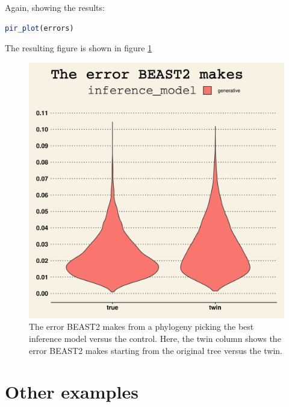 \documentclass{article}
\begin{document}
Again, showing the results:

\begin{lstlisting}[language=R, floatplacement=H, frame=single]
pir_plot(errors)
\end{lstlisting}

The resulting figure is shown in figure \ref{fig:example_3}

\begin{figure}[h]
  \includegraphics[width=\textwidth]{figure_example_3.png}
  \caption{
    The error BEAST2 makes from a phylogeny picking the best inference model versus the control.
    Here, the twin column shows the error BEAST2 makes starting from the original tree versus the twin. 
  }
  \label{fig:example_3}
\end{figure}

\section{Other examples}
\end{document}
